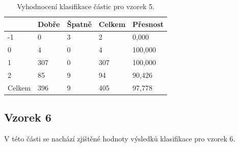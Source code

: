 \documentclass[11pt,twoside,a4paper,table]{book}
\begin{document}
\begin{table}[h]
\begin{center}
\begin{tabular}{lllll}
\rowcolor[HTML]{9B9B9B} 
\multicolumn{1}{|l|}{\cellcolor[HTML]{9B9B9B}Třída} & \multicolumn{1}{l|}{\cellcolor[HTML]{9B9B9B}Dobře} & \multicolumn{1}{l|}{\cellcolor[HTML]{9B9B9B}Špatně}  & \multicolumn{1}{l|}{\cellcolor[HTML]{9B9B9B}Celkem} & \multicolumn{1}{l|}{\cellcolor[HTML]{9B9B9B}Přesnost} \\ \hline
\multicolumn{1}{|l|}{-1}                            & \multicolumn{1}{l|}{0}                             & \multicolumn{1}{l|}{3}                               & \multicolumn{1}{l|}{2}                              & \multicolumn{1}{l|}{0,000}                            \\ \hline
\multicolumn{1}{|l|}{0}                             & \multicolumn{1}{l|}{4}                             & \multicolumn{1}{l|}{0}                               & \multicolumn{1}{l|}{4}                              & \multicolumn{1}{l|}{100,000}                          \\ \hline
\multicolumn{1}{|l|}{1}                             & \multicolumn{1}{l|}{307}                           & \multicolumn{1}{l|}{0}                               & \multicolumn{1}{l|}{307}                            & \multicolumn{1}{l|}{100,000}                          \\ \hline
\multicolumn{1}{|l|}{2}                             & \multicolumn{1}{l|}{85}                            & \multicolumn{1}{l|}{9}                               & \multicolumn{1}{l|}{94}                             & \multicolumn{1}{l|}{90,426}                           \\ \hline
\multicolumn{1}{|l|}{Celkem}                        & \multicolumn{1}{l|}{396}                           & \multicolumn{1}{l|}{9}                               & \multicolumn{1}{l|}{405}                            & \multicolumn{1}{l|}{97,778}                           \\ \hline
\end{tabular}
\end{center}
\caption{Vyhodnocení klasifikace částic pro vzorek 5.}
\label{tab:classresult6}
\end{table}

\newpage
\FloatBarrier
\subsection{Vzorek 6}
V této části se nachází zjištěné hodnoty výsledků klasifikace pro vzorek 6.
\end{document}
